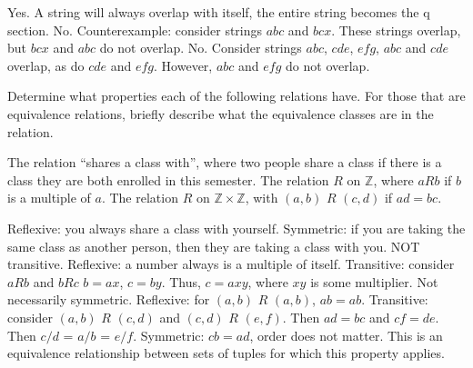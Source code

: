 \documentclass[solution, letterpaper]{cs20inclass}
\begin{document}
\begin{solution}
\subsolution Yes. A string will always overlap with itself, the entire string becomes the q section. 
\subsolution No. Counterexample: consider strings $abc$ and $bcx$. These strings overlap, but $bcx$ and $abc$ do not overlap. 
\subsolution No. Consider strings $abc$, $cde$, $efg$, $abc$ and $cde$ overlap, as do $cde$ and $efg$. However, $abc$ and $efg$ do not overlap. 

 
\end{solution}

\problem Determine what properties each of the following relations have. For those that are equivalence relations, briefly describe what the equivalence classes are in the relation.

\subproblem The relation ``shares a class with'', where two people share a class if there is a class they are both enrolled in this semester.
\subproblem The relation $R$ on $\mathbb{Z}$, where $aRb$ if $b$ is a multiple of $a$.
\subproblem The relation $R$ on $\mathbb{Z} \times \mathbb{Z}$, with $(a,b)$ $R$ $(c,d)$ if $ad = bc$. 


\begin{solution}
\subsolution Reflexive: you always share a class with yourself. Symmetric: if you are taking the same class as another person, then they are taking a class with you. NOT transitive. 
\subsolution Reflexive: a number always is a multiple of itself.  Transitive: consider $aRb$ and  $bRc$ $b = ax$, $c = by$. Thus, $c = axy$, where $xy$ is some multiplier. Not necessarily symmetric. 
\subsolution Reflexive: for $(a,b)$ $R$ $(a,b)$, $ab = ab$. Transitive: consider $(a,b)$ $R$ $(c,d)$ and  $(c,d)$ $R$ $(e,f)$. Then $ad = bc$ and $cf = de$. Then $c/d$ = $a/b$ = $e/f$. Symmetric: $cb = ad$, order does not matter. This is an equivalence relationship between sets of tuples for which this property applies. 

\end{solution}
\end{document}
